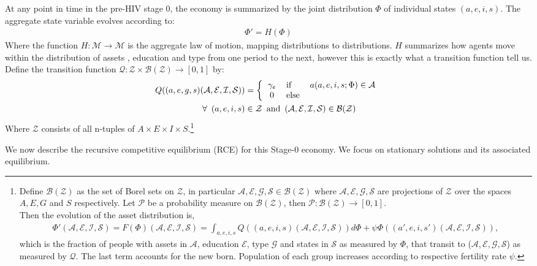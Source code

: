 At any point in time in the pre-HIV stage 0, the economy is summarized by the joint distribution $\Phi$ of individual states $(a,e,i,s)$. The aggregate state variable evolves according to:
\begin{align}
\Phi'=H(\Phi)
\end{align}
Where the function $H:\mathcal{M}\to\mathcal{M}$ is the aggregate law of motion, mapping distributions to distributions. $H$ summarizes how agents move within the distribution of assets , education and type from one period to the next, however this is exactly what a transition function tell us.
\noindent Define the transition function $\mathcal{Q}:\mathcal{Z}\times\mathcal{B(Z)}\to[0,1]$ by:
\begin{align*}
Q((a,e,g,s)(\mathcal{A},\mathcal{E},\mathcal{I},\mathcal{S})) &= \left\{
\begin{tabular}{clc}
$\gamma_{e}$ & if      & $a(a,e,i,s;\Phi) \in \mathcal{A} $\\
0 & else &
\end{tabular}
\right.\\
\forall \,\,\,(a,e,i,s)&\in\mathcal{Z}\,\,\,\mbox{and}\,\,\,(\mathcal{A,E,I,S})\in{\mathcal{B(Z)}}
\end{align*}
Where $\mathcal{Z}$ consists of all n-tuples of ${A}\times {E}\times {I}\times {S}$.\footnote{\sf Define $\mathcal{B(Z)}$ as the set of Borel sets on $\mathcal{Z}$, in particular $\mathcal{A,E,G,S}\in\mathcal{B(Z)}$ where $\mathcal{A,E,G,S}$ are projections of $\mathcal{Z}$ over the spaces $A,E,G$ and $S$ respectively. Let $\mathcal{P}$ be a probability measure on $\mathcal{B(Z)}$, then $\mathcal{P}: \mathcal{B(Z)}\to[0,1]$.\\
Then the evolution of the asset distribution is,
\begin{align}
\Phi'(\mathcal{A,E,I,S}) = F(\Phi) (\mathcal{A,E,I,S})= \int_{a,e,i,s} Q((a,e,i,s)(\mathcal{A,E,I,S})) d \Phi+ \psi \Phi((a',e,i,s')(\mathcal{A,E,I,S})),
\end{align}
which is the fraction of people with assets in $\mathcal{A}$, education $\mathcal{E}$, type $\mathcal{G}$ and states in $\mathcal{S}$ as measured by $\Phi$, that transit to ($\mathcal{A,E,G,S}$) as measured by $\mathcal{Q}$. The last term accounts for the new born. Population of each group increases according to respective fertility rate $\psi$. }

We now describe the recursive competitive equilibrium (RCE) for this Stage-0 economy. We focus on stationary solutions and its associated equilibrium.

